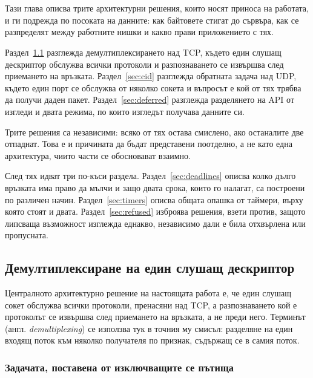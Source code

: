 \section{}

Тази глава описва трите архитектурни решения, които носят приноса на работата, и ги
подрежда по посоката на данните: как байтовете стигат до сървъра, как се разпределят между
работните нишки и какво прави приложението с тях.

Раздел~\ref{sec:demux} разглежда демултиплексирането над TCP, където един слушащ
дескриптор обслужва всички протоколи и разпознаването се извършва след приемането на
връзката. Раздел~\ref{sec:cid} разглежда обратната задача над UDP, където един порт се
обслужва от няколко сокета и въпросът е кой от тях трябва да получи даден пакет.
Раздел~\ref{sec:deferred} разглежда разделянето на API от изгледи и двата режима, по които
изгледът получава данните си.

Трите решения са независими: всяко от тях остава смислено, ако останалите две отпаднат.
Това е и причината да бъдат представени поотделно, а не като една архитектура, чиито части
се обосновават взаимно.

След тях идват три по-къси раздела. Раздел~\ref{sec:deadlines} описва колко дълго връзката
има право да мълчи и защо двата срока, които го налагат, са построени по различен начин.
Раздел~\ref{sec:timers} описва общата опашка от таймери, върху която стоят и двата.
Раздел~\ref{sec:refused} изброява решения, взети против, защото липсваща възможност
изглежда еднакво, независимо дали е била отхвърлена или пропусната.

\subsection{Демултиплексиране на един слушащ дескриптор}
\label{sec:demux}

Централното архитектурно решение на настоящата работа е, че един слушащ сокет обслужва
всички протоколи, пренасяни над TCP, а разпознаването кой е протоколът се извършва след
приемането на връзката, а не преди него. Терминът  (англ.
\emph{demultiplexing}) се използва тук в точния му смисъл: разделяне на един входящ
поток към няколко получателя по признак, съдържащ се в самия поток.

\subsubsection{Задачата, поставена от изключващите се пътища}

